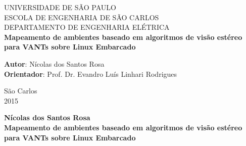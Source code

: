 \begin{titlepage}
	\begin{center}
		\Huge{UNIVERSIDADE DE SÃO PAULO}\\
		\vspace{0.02\textheight}
		\huge{ESCOLA DE ENGENHARIA DE SÃO CARLOS}\\
		\vspace{0.01\textheight}
		\huge{DEPARTAMENTO DE ENGENHARIA ELÉTRICA}\\
		\vspace{0.2\textheight}
		\huge{\textbf{Mapeamento de ambientes baseado em algoritmos de visão estéreo para VANTs sobre Linux Embarcado}}
		\vspace{0.2\textheight}
	\end{center}
		
		\large
		{
			\begin{flushleft}
			\Large{ \textbf{Autor}: \hspace{1cm} Nícolas dos Santos Rosa}\\
			\Large{ \textbf{Orientador}: \hspace{0.3cm} Prof. Dr. Evandro Luís Linhari Rodrigues }\\
			\end{flushleft}
	
			\begin{center}
				\vspace{0.09\textheight}
				\Large{São Carlos}\\
				\Large{2015}
			\end{center}
		}
	
\end{titlepage}


\cleardoublepage

	\begin{center}
	\vspace{-0.06\textheight}
		\Large{\textbf{Nícolas dos Santos Rosa}}\\
		\vspace{0.15\textheight}
		\Huge{\textbf{Mapeamento de ambientes baseado em algoritmos de visão estéreo para VANTs sobre Linux Embarcado}} 
		\vspace{0.08\textheight}
	\end{center}
		
